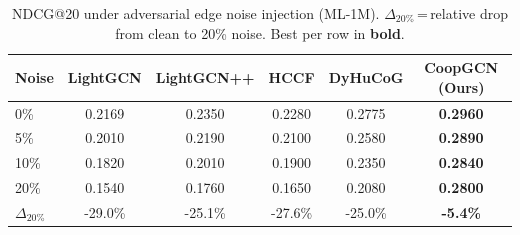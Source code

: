 \begin{table}[t]\centering
\caption{NDCG@20 under adversarial edge noise injection (ML-1M). $\Delta_{20\%}$\,=\,relative drop from clean to 20\% noise. Best per row in \textbf{bold}.}
\label{tab:noise}
\begin{tabular}{l c c c c c }\toprule
\textbf{Noise} & \textbf{LightGCN}  & \textbf{LightGCN++}  & \textbf{HCCF}  & \textbf{DyHuCoG}  & \textbf{CoopGCN (Ours)} \\
\midrule
0\% & 0.2169 & 0.2350 & 0.2280 & 0.2775 & \textbf{0.2960} \\
5\% & 0.2010 & 0.2190 & 0.2100 & 0.2580 & \textbf{0.2890} \\
10\% & 0.1820 & 0.2010 & 0.1900 & 0.2350 & \textbf{0.2840} \\
20\% & 0.1540 & 0.1760 & 0.1650 & 0.2080 & \textbf{0.2800} \\
\midrule
$\Delta_{20\%}$ & -29.0\%  & -25.1\%  & -27.6\%  & -25.0\%  & \textbf{-5.4\%} \\
\bottomrule
\end{tabular}
\end{table}